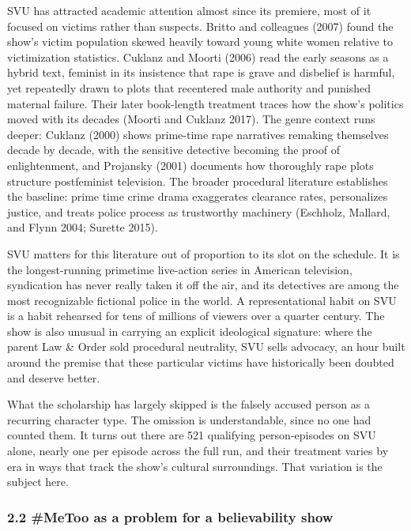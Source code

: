 \documentclass[
]{article}
\begin{document}
SVU has attracted academic attention almost since its premiere, most of
it focused on victims rather than suspects. Britto and colleagues (2007)
found the show's victim population skewed heavily toward young white
women relative to victimization statistics. Cuklanz and Moorti (2006)
read the early seasons as a hybrid text, feminist in its insistence that
rape is grave and disbelief is harmful, yet repeatedly drawn to plots
that recentered male authority and punished maternal failure. Their
later book-length treatment traces how the show's politics moved with
its decades (Moorti and Cuklanz 2017). The genre context runs deeper:
Cuklanz (2000) shows prime-time rape narratives remaking themselves
decade by decade, with the sensitive detective becoming the proof of
enlightenment, and Projansky (2001) documents how thoroughly rape plots
structure postfeminist television. The broader procedural literature
establishes the baseline: prime time crime drama exaggerates clearance
rates, personalizes justice, and treats police process as trustworthy
machinery (Eschholz, Mallard, and Flynn 2004; Surette 2015).

SVU matters for this literature out of proportion to its slot on the
schedule. It is the longest-running primetime live-action series in
American television, syndication has never really taken it off the air,
and its detectives are among the most recognizable fictional police in
the world. A representational habit on SVU is a habit rehearsed for tens
of millions of viewers over a quarter century. The show is also unusual
in carrying an explicit ideological signature: where the parent Law \&
Order sold procedural neutrality, SVU sells advocacy, an hour built
around the premise that these particular victims have historically been
doubted and deserve better.

What the scholarship has largely skipped is the falsely accused person
as a recurring character type. The omission is understandable, since no
one had counted them. It turns out there are 521 qualifying
person-episodes on SVU alone, nearly one per episode across the full
run, and their treatment varies by era in ways that track the show's
cultural surroundings. That variation is the subject here.

\subsubsection{2.2 \#MeToo as a problem for a believability
show}\label{metoo-as-a-problem-for-a-believability-show}
\end{document}
